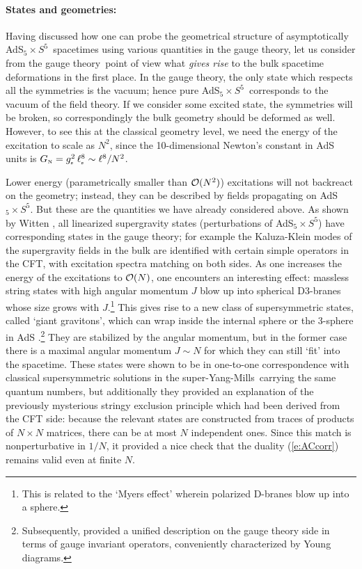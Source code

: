 \documentclass[12pt]{article}
\def\req#1{(\ref{#1})}
\def\GT{gauge theory}
\def\SYM{super-Yang-Mills}
\def\gst{g_{\scriptscriptstyle {\rm s}}}
\def\GN{G_{\scriptscriptstyle {\rm N}}}
\def\lst{\ell_{\scriptscriptstyle {\rm s}}}
\def\adss#1#2{AdS$_{#1} \times S^{#2}$}
\def\Rads{\ell}
\begin{document}
\paragraph{States and geometries:}  %
Having discussed how one can probe the geometrical structure of asymptotically \adss55\ spacetimes using various quantities in  the \GT, let us consider from the \GT\  point of view what {\it gives rise} to the bulk spacetime deformations in the first place.  In the \GT, the only state which respects all the symmetries is the vacuum; hence pure \adss55\ corresponds to the vacuum of the field theory.  If we consider some excited state, the symmetries will be broken, so correspondingly the bulk geometry should be deformed as well.  However, to see this at the classical geometry level, we need the energy of the excitation to scale as $N^2$, since the 10-dimensional Newton's constant in AdS units is $\GN = \gst^2 \, 
\lst^8 \sim \Rads^8 / N^2$.  

Lower energy (parametrically smaller than ${\cal O}(N^2)$) excitations will not backreact on the geometry; instead, they can be described by fields propagating on \adss55.  
But these are the quantities we have already considered above.
As shown by Witten \cite{Witten:1998qj}, 
all linearized supergravity states (perturbations of \adss55) have corresponding states in the gauge theory; for example the Kaluza-Klein modes of the supergravity fields in the bulk are identified with certain simple operators in the CFT, with excitation spectra matching on both sides.
As one increases the energy of the excitations to ${\cal O}(N)$,  one encounters an interesting effect: massless string states with high angular momentum $J$ blow up into spherical D3-branes whose size grows with $J$.\footnote{
This is related to the `Myers effect' \cite{Myers:1999ps} wherein polarized D-branes blow up into a sphere. 
}  This gives rise to  a new class of supersymmetric states, called `giant gravitons', which can wrap inside the internal sphere \cite{McGreevy:2000cw} or the 3-sphere in AdS \cite{Hashimoto:2000zp}.\footnote{
Subsequently, \cite{Corley:2001zk} provided a unified description on the gauge theory side in terms of gauge invariant operators, conveniently characterized by Young diagrams.}
They are stabilized by the angular momentum, but in the former case  there is a maximal angular momentum $J \sim N$ for which they can still `fit' into the spacetime.
These states were shown to be in one-to-one correspondence with classical supersymmetric solutions in the \SYM\ carrying the same quantum numbers, but additionally they provided an explanation of the previously mysterious stringy exclusion principle \cite{Maldacena:1998bw} which had been derived from the CFT side: because the relevant states are constructed from traces of products of $N \times N$ matrices, there can be at most $N$ independent ones.  
Since this match is nonperturbative in $1/N$, it provided a nice check that the duality \req{e:ACcorr} remains valid even at finite $N$.
\end{document}
